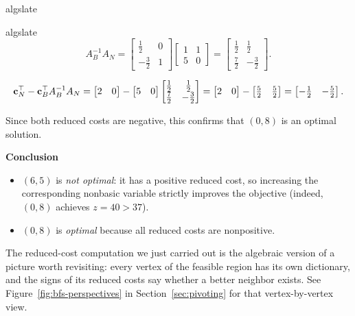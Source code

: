 \begin{solution}
\begin{steppanel}{algslate}
\end{steppanel}
\begin{steppanel}{algslate}
\[
A_B^{-1} A_N =
\begin{bmatrix}
    \tfrac12 & 0 \\
    -\tfrac32 & 1
\end{bmatrix}
\begin{bmatrix}
    1 & 1 \\
    5 & 0
\end{bmatrix}
=
\begin{bmatrix}
    \tfrac12 & \tfrac12 \\
    \tfrac72 & -\tfrac32
\end{bmatrix}.
\]

\[
\mathbf{c}_N^\top -\mathbf{c}_B^\top A_B^{-1} A_N =
\begin{bmatrix}
    2 & 0
\end{bmatrix}
-
\begin{bmatrix}
    5 & 0
\end{bmatrix}
\begin{bmatrix}
    \tfrac12 & \tfrac12 \\
    \tfrac72 & -\tfrac32
\end{bmatrix}
=
\begin{bmatrix}
    2 & 0
\end{bmatrix}
-
\begin{bmatrix}
    \tfrac52 & \tfrac52
\end{bmatrix}
=
\begin{bmatrix}
    -\tfrac12 & -\tfrac52
\end{bmatrix}.
\]
\end{steppanel}
Since both reduced costs are negative, this confirms that $(0,8)$ is an optimal solution.

\textbf{Conclusion}
\begin{itemize}
\item \( (6,5) \) is \emph{not optimal}: it has a positive reduced cost, so increasing the corresponding nonbasic variable strictly improves the objective (indeed, \( (0,8) \) achieves \( z = 40 > 37 \)).
\item \( (0,8) \) is \emph{optimal} because all reduced costs are nonpositive.
\end{itemize}
\end{solution}

The reduced-cost computation we just carried out is the algebraic version of a picture worth revisiting: every vertex of the feasible region has its own dictionary, and the signs of its reduced costs say whether a better neighbor exists.  See Figure~\ref{fig:bfs-perspectives} in Section~\ref{sec:pivoting} for that vertex-by-vertex view.


